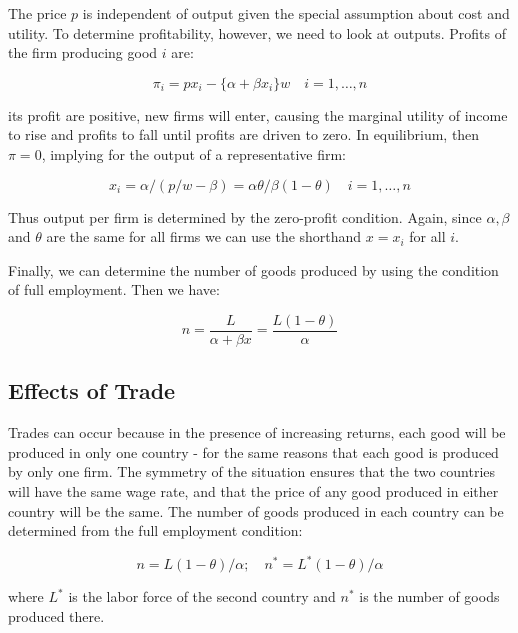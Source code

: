 The price $p$ is independent of output given the special assumption about cost and utility. To determine profitability, however, we need to look at outputs. Profits of the firm producing good $i$ are:

\begin{equation}
    \pi_i = p x_i - \{\alpha + \beta x_i\}w \quad i = 1, \ldots, n
\end{equation}

its profit are positive, new firms will enter, causing the marginal utility of income to rise and profits to fall until profits are driven to zero. In equilibrium, then $\pi = 0$, implying for the output of a representative firm:

\begin{equation}
    x_i = \alpha / (p / w - \beta) = \alpha \theta / \beta (1 - \theta) \quad i = 1, \ldots, n
\end{equation}

Thus output per firm is determined by the zero-profit condition. Again, since $\alpha, \beta$ and $\theta$ are the same for all firms we can use the shorthand $x = x_i$ for all $i$.

Finally, we can determine the number of goods produced by using the condition of full employment. Then we have:

\begin{equation}
    n = \frac{L}{\alpha + \beta x} = \frac{L(1 - \theta)}{\alpha}
\end{equation}

\subsection{Effects of Trade}

Trades can occur because in the presence of increasing returns, each good will be produced in only one country - for the same reasons that each good is produced by only one firm. The symmetry of the situation ensures that the two countries will have the same wage rate, and that the price of any good produced in either country will be the same. The number of goods produced in each country can be determined from the full employment condition:

\begin{equation}
    n = L(1 - \theta) / \alpha; \quad n^* = L^*(1 - \theta) / \alpha
\end{equation}

where $L^*$ is the labor force of the second country and $n^*$ is the number of goods produced there.

